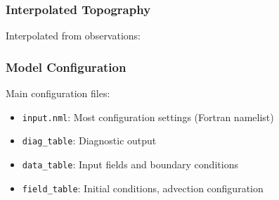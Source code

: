 \documentclass[red]{beamer}
\begin{document}
\begin{frame}
    \frametitle{Interpolated Topography}

    Interpolated from observations:
    

\end{frame}
\begin{frame}
    \frametitle{Model Configuration}
    
    Main configuration files:
    \begin{itemize}
        \item \lstinline|input.nml|: Most configuration settings (Fortran
            namelist)
        \item \lstinline|diag_table|: Diagnostic output
        \item \lstinline|data_table|: Input fields and boundary conditions
        \item \lstinline|field_table|: Initial conditions, advection
            configuration
    \end{itemize}
\end{frame}

\end{document}
